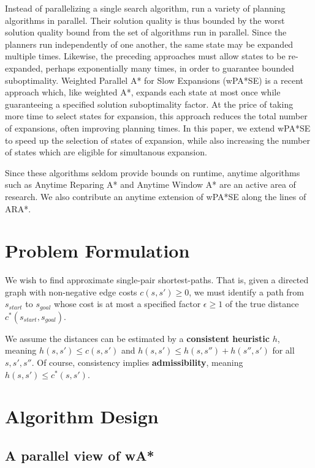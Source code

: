 \documentclass[letterpaper]{article}
\begin{document}
Instead of parallelizing a single search algorithm, \cite{valenzano10} run a variety of planning algorithms in parallel.
Their solution quality is thus bounded by the worst solution quality bound from the set of algorithms
run in parallel. Since the planners run independently of one another, the same state may be expanded multiple times.
Likewise, the preceding approaches must allow states to be re-expanded, perhaps exponentially many times, in order to guarantee bounded suboptimality. Weighted Parallel A* for Slow Expansions (wPA*SE) \cite{phillips2014pa}
is a recent approach which, like weighted A*, expands each state at most once
while guaranteeing a specified solution suboptimality factor. At the price of taking more time to select states for expansion, this approach reduces the total number of expansions, often improving planning times.
In this paper, we extend wPA*SE to speed up the selection of states of expansion, while also increasing the number of states which are eligible for simultanous expansion.

Since these algorithms seldom provide bounds on runtime, anytime algorithms such as Anytime Reparing A* \cite{likhachev2003ara} and Anytime Window A* \cite{aine2007awa} are an active area of research.
We also contribute an anytime extension of wPA*SE along the lines of ARA*. 

\section{Problem Formulation}

We wish to find approximate single-pair shortest-paths. That is, given a directed graph with non-negative edge costs $c(s,s') \ge 0$, we must identify a path from $s_{start}$ to $s_{goal}$ whose cost is at most a specified factor $\epsilon\ge 1$ of the true distance $c^*(s_{start},s_{goal})$.

We assume the distances can be estimated by a \textbf{consistent heuristic} $h$, meaning $h(s,s')\le c(s,s')$ and $h(s,s')\le h(s,s'') + h(s'',s')$ for all $s,s',s''$. Of course, consistency implies \textbf{admissibility}, meaning $h(s,s')\le c^*(s,s')$.

\section{Algorithm Design}

\subsection{A parallel view of wA*}
\end{document}
